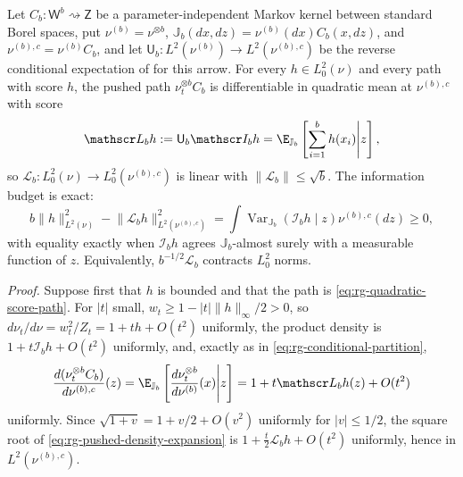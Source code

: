 Let \(C_b:\mathsf W^b\rightsquigarrow\mathsf Z\) be a parameter-independent Markov
kernel between standard Borel spaces, put \(\nu^{(b)}=\nu^{\otimes b}\),
\(\mathbb J_b(dx,dz)=\nu^{(b)}(dx)C_b(x,dz)\), and \(\nu^{(b),c}=\nu^{(b)}C_b\), and
let \(\mathsf U_b:L^2(\nu^{(b)})\to L^2(\nu^{(b),c})\) be the reverse conditional expectation of
 for this arrow. For every \(h\in L^2_0(\nu)\) and
every path with score \(h\), the pushed path \(\nu_t^{\otimes b}C_b\) is differentiable
in quadratic mean at \(\nu^{(b),c}\) with score
\begin{equation}
\mathscr L_bh:=\mathsf U_b\mathscr I_bh
=\E_{\mathbb J_b}\left[\sum_{i=1}^bh(x_i)\middle| z\right],
\label{eq:rg-score-renormalization-operator}
\end{equation}
so \(\mathscr L_b:L^2_0(\nu)\to L^2_0(\nu^{(b),c})\) is linear with
\(\lVert\mathscr L_b\rVert\leq\sqrt b\). The information budget is exact:
\begin{equation}
b\lVert h\rVert_{L^2(\nu)}^2
-\lVert\mathscr L_bh\rVert_{L^2(\nu^{(b),c})}^2
=\int\operatorname{Var}_{\mathbb J_b}\left(\mathscr I_bh\middle| z\right)
\nu^{(b),c}(dz)
\geq0,
\label{eq:rg-extensive-fisher-defect}
\end{equation}
with equality exactly when \(\mathscr I_bh\) agrees \(\mathbb J_b\)-almost surely with a
measurable function of \(z\). Equivalently, \(b^{-1/2}\mathscr L_b\) contracts
\(L^2_0\) norms. 

\noindent\emph{Proof.}
Suppose first that \(h\) is bounded and that the path is
\eqref{eq:rg-quadratic-score-path}. For \(\lvert t\rvert\) small, \(w_t\geq1-\lvert t\rvert\lVert h\rVert_\infty/2>0\),
so \(d\nu_t/d\nu=w_t^2/Z_t=1+th+O(t^2)\) uniformly, the product density is
\(1+t\mathscr I_bh+O(t^2)\) uniformly, and, exactly as in
\eqref{eq:rg-conditional-partition},
\begin{equation}
\frac{d(\nu_t^{\otimes b}C_b)}{d\nu^{(b),c}}(z)
=\E_{\mathbb J_b}\left[
\frac{d\nu_t^{\otimes b}}{d\nu^{(b)}}(x)\middle| z\right]
=1+t\mathscr L_bh(z)+O(t^2)
\label{eq:rg-pushed-density-expansion}
\end{equation}
uniformly. Since \(\sqrt{1+v}=1+v/2+O(v^2)\) uniformly for \(\lvert v\rvert\leq1/2\), the
square root of \eqref{eq:rg-pushed-density-expansion} is
\(1+\tfrac t2\mathscr L_bh+O(t^2)\) uniformly, hence in \(L^2(\nu^{(b),c})\).


